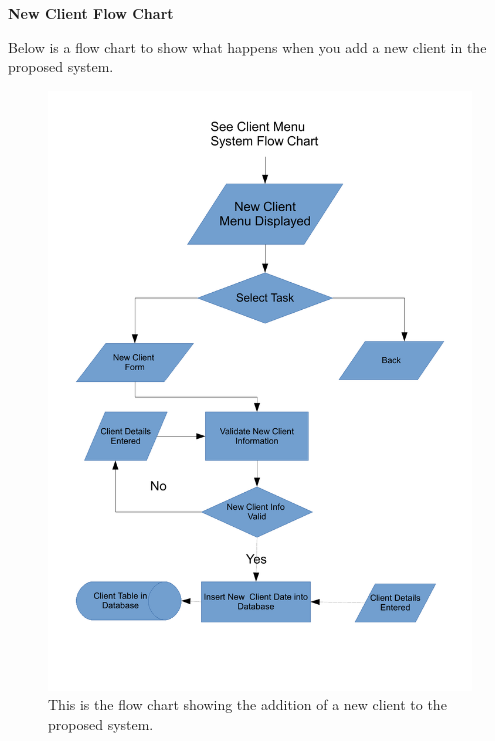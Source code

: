 \pagebreak
\textbf{New Client Flow Chart}
\begin{flushleft}
Below is a flow chart to show what happens when you add a new client in the proposed system.
\end{flushleft}
\begin{figure}[H]
    \includegraphics[scale=0.5]{./Design/images/FlowChartNewClient.pdf}
    \caption{This is the flow chart showing the addition of a new client to the proposed system.} 
\label{fig:FlowChartNewClient}
\end{figure}


